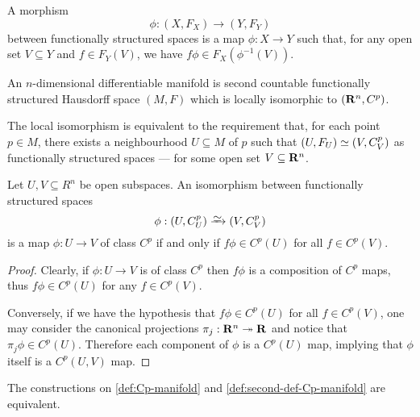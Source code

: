 \begin{definition}
\label{def:morphism-functionally-structured-spaces}
A morphism
\[
\phi: (X, F_X) \to (Y, F_Y)
\]
between functionally structured spaces is a map \(\phi: X \to Y\) such that, for
any open set \(V \subseteq Y\) and \(f \in F_Y(V)\), we have
\(f \phi \in F_X(\phi^{-1}(V))\).
\end{definition}

\begin{definition}
\label{def:second-def-Cp-manifold}
An \(n\)-dimensional differentiable manifold is second countable functionally
structured Hausdorff space \((M, F)\) which is locally isomorphic to
\((\mathbf{R}^n, C^p)\).

The local isomorphism is equivalent to the requirement that, for each
point \(p \in M\), there exists a neighbourhood \(U \subseteq M\) of \(p\) such
that \((U, F_U) \simeq (V, C_V^p)\) as functionally structured spaces --- for
some open set \(V \subseteq \mathbf{R}^n\).
\end{definition}

\begin{lemma}
\label{lem:morphism-func-struc-is-Cp}
Let \(U, V \subseteq R^n\) be open subspaces. An isomorphism between
functionally structured spaces
\[
\phi: (U, C_U^p) \isoto (V, C_V^p)
\]
is a map \(\phi: U \to V\) of class \(C^p\) if and only if \(f \phi \in C^p(U)\)
for all \(f \in C^p(V)\).
\end{lemma}

\begin{proof}
Clearly, if \(\phi: U \to V\) is of class \(C^p\) then \(f \phi\) is a
composition of \(C^p\) maps, thus \(f \phi \in C^p(U)\) for any \(f \in
C^p(V)\).

Conversely, if we have the hypothesis that \(f \phi \in C^p(U)\) for all
\(f \in C^p(V)\), one may consider the canonical projections
\(\pi_j: \mathbf{R}^n \twoheadrightarrow \mathbf{R}\) and notice that \(\pi_j \phi \in C^p(U)\). Therefore
each component of \(\phi\) is a \(C^p(U)\) map, implying that \(\phi\) itself is
a \(C^p(U, V)\) map.
\end{proof}

\begin{lemma}
\label{lem:equivalence-def-Cp-man}
The constructions on \cref{def:Cp-manifold} and
\cref{def:second-def-Cp-manifold} are equivalent.
\end{lemma}

